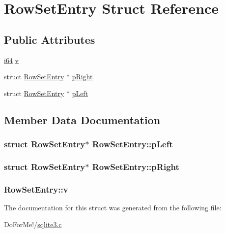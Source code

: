 \hypertarget{struct_row_set_entry}{\section{Row\-Set\-Entry Struct Reference}
\label{struct_row_set_entry}
}
\subsection*{Public Attributes}
\begin{DoxyCompactItemize}
\item 
\hyperlink{sqlite3_8c_a2a0f0f4ae7001eb54351f77ea1cdbcfd}{i64} \hyperlink{struct_row_set_entry_ac72670935246f1bff5e4d96703574071}{v}
\item 
struct \hyperlink{struct_row_set_entry}{Row\-Set\-Entry} $\ast$ \hyperlink{struct_row_set_entry_ac39c09525dd24f42af522587d1bc5026}{p\-Right}
\item 
struct \hyperlink{struct_row_set_entry}{Row\-Set\-Entry} $\ast$ \hyperlink{struct_row_set_entry_a59365203c30ce782ae38e534c90db14b}{p\-Left}
\end{DoxyCompactItemize}


\subsection{Member Data Documentation}
\hypertarget{struct_row_set_entry_a59365203c30ce782ae38e534c90db14b}{
\subsubsection[{p\-Left}]{\setlength{\rightskip}{0pt plus 5cm}struct {\bf Row\-Set\-Entry}$\ast$ Row\-Set\-Entry\-::p\-Left}}\label{struct_row_set_entry_a59365203c30ce782ae38e534c90db14b}
\hypertarget{struct_row_set_entry_ac39c09525dd24f42af522587d1bc5026}{
\subsubsection[{p\-Right}]{\setlength{\rightskip}{0pt plus 5cm}struct {\bf Row\-Set\-Entry}$\ast$ Row\-Set\-Entry\-::p\-Right}}\label{struct_row_set_entry_ac39c09525dd24f42af522587d1bc5026}
\hypertarget{struct_row_set_entry_ac72670935246f1bff5e4d96703574071}{
\subsubsection[{v}]{ Row\-Set\-Entry\-::v}}\label{struct_row_set_entry_ac72670935246f1bff5e4d96703574071}


The documentation for this struct was generated from the following file\-:\begin{DoxyCompactItemize}
\item 
Do\-For\-Me!/\hyperlink{sqlite3_8c}{sqlite3.\-c}\end{DoxyCompactItemize}
